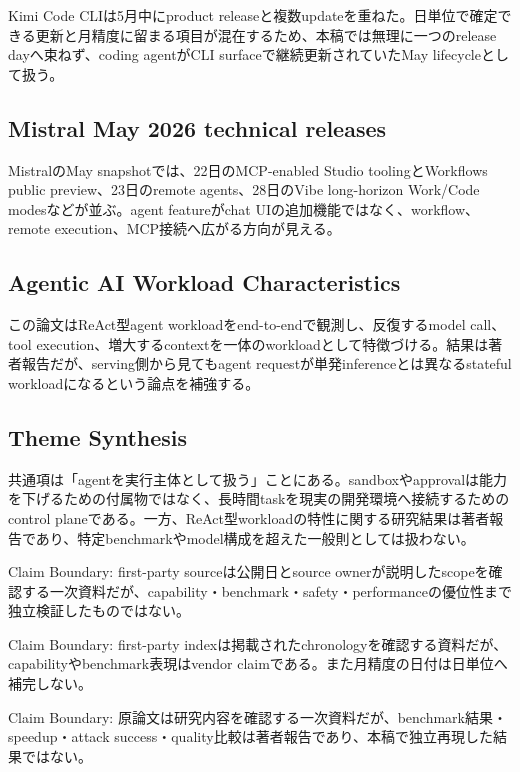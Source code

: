 Kimi Code CLIは5月中にproduct releaseと複数updateを重ねた。日単位で確定できる更新と月精度に留まる項目が混在するため、本稿では無理に一つのrelease dayへ束ねず、coding agentがCLI surfaceで継続更新されていたMay lifecycleとして扱う。\autocite{src-9191d43918fc}


\subsection{Mistral May 2026 technical releases}

MistralのMay snapshotでは、22日のMCP-enabled Studio toolingとWorkflows public preview、23日のremote agents、28日のVibe long-horizon Work/Code modesなどが並ぶ。agent featureがchat UIの追加機能ではなく、workflow、remote execution、MCP接続へ広がる方向が見える。\autocite{src-d8b7c1c36830}


\subsection{Agentic AI Workload Characteristics}

この論文はReAct型agent workloadをend-to-endで観測し、反復するmodel call、tool execution、増大するcontextを一体のworkloadとして特徴づける。結果は著者報告だが、serving側から見てもagent requestが単発inferenceとは異なるstateful workloadになるという論点を補強する。\autocite{src-ac04c00cf21f}


\subsection{Theme Synthesis}

共通項は「agentを実行主体として扱う」ことにある。sandboxやapprovalは能力を下げるための付属物ではなく、長時間taskを現実の開発環境へ接続するためのcontrol planeである。一方、ReAct型workloadの特性に関する研究結果は著者報告であり、特定benchmarkやmodel構成を超えた一般則としては扱わない。\autocite{src-4a3442a5ca8c,src-66be12207714,src-9191d43918fc,src-ac04c00cf21f,src-d8b7c1c36830}


\begin{claimboundary}
Claim Boundary: first-party sourceは公開日とsource ownerが説明したscopeを確認する一次資料だが、capability・benchmark・safety・performanceの優位性まで独立検証したものではない。\autocite{src-4a3442a5ca8c,src-66be12207714,src-9191d43918fc,src-ac04c00cf21f,src-d8b7c1c36830}
\end{claimboundary}

\begin{claimboundary}
Claim Boundary: first-party indexは掲載されたchronologyを確認する資料だが、capabilityやbenchmark表現はvendor claimである。また月精度の日付は日単位へ補完しない。\autocite{src-4a3442a5ca8c,src-66be12207714,src-9191d43918fc,src-ac04c00cf21f,src-d8b7c1c36830}
\end{claimboundary}

\begin{claimboundary}
Claim Boundary: 原論文は研究内容を確認する一次資料だが、benchmark結果・speedup・attack success・quality比較は著者報告であり、本稿で独立再現した結果ではない。\autocite{src-4a3442a5ca8c,src-66be12207714,src-9191d43918fc,src-ac04c00cf21f,src-d8b7c1c36830}
\end{claimboundary}
